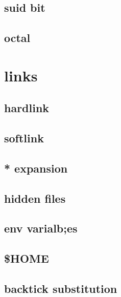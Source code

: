 \documentclass[hyperref={pdfpagelabels=false}]{beamer}
\begin{document}
\subsection{suid bit}
\subsection{octal}
\section{links}
\subsection{hardlink}
\subsection{softlink}
\subsection{* expansion}
\subsection{hidden files}
\subsection{env varialb;es}
\subsection{\$HOME}
\subsection{backtick substitution}
\end{document}
